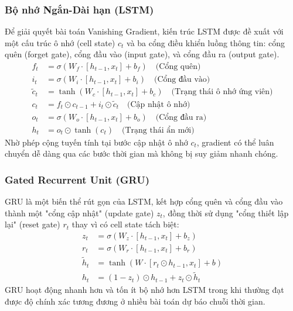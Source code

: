\documentclass[12pt,a4paper]{article}
\begin{document}
\subsubsection{Bộ nhớ Ngắn-Dài hạn (LSTM)}
Để giải quyết bài toán Vanishing Gradient, kiến trúc LSTM được đề xuất với một cấu trúc ô nhớ (cell state) $c_t$ và ba cổng điều khiển luồng thông tin: cổng quên (forget gate), cổng đầu vào (input gate), và cổng đầu ra (output gate).
\begin{align}
    f_t &= \sigma(W_f \cdot [h_{t-1}, x_t] + b_f) \quad \text{(Cổng quên)} \\
    i_t &= \sigma(W_i \cdot [h_{t-1}, x_t] + b_i) \quad \text{(Cổng đầu vào)} \\
    \tilde{c}_t &= \tanh(W_c \cdot [h_{t-1}, x_t] + b_c) \quad \text{(Trạng thái ô nhớ ứng viên)} \\
    c_t &= f_t \odot c_{t-1} + i_t \odot \tilde{c}_t \quad \text{(Cập nhật ô nhớ)} \\
    o_t &= \sigma(W_o \cdot [h_{t-1}, x_t] + b_o) \quad \text{(Cổng đầu ra)} \\
    h_t &= o_t \odot \tanh(c_t) \quad \text{(Trạng thái ẩn mới)}
\end{align}
Nhờ phép cộng tuyến tính tại bước cập nhật ô nhớ $c_t$, gradient có thể luân chuyển dễ dàng qua các bước thời gian mà không bị suy giảm nhanh chóng.

\subsubsection{Gated Recurrent Unit (GRU)}
GRU là một biến thể rút gọn của LSTM, kết hợp cổng quên và cổng đầu vào thành một "cổng cập nhật" (update gate) $z_t$, đồng thời sử dụng "cổng thiết lập lại" (reset gate) $r_t$ thay vì có cell state tách biệt:
\begin{align}
    z_t &= \sigma(W_z \cdot [h_{t-1}, x_t] + b_z) \\
    r_t &= \sigma(W_r \cdot [h_{t-1}, x_t] + b_r) \\
    \tilde{h}_t &= \tanh(W \cdot [r_t \odot h_{t-1}, x_t] + b) \\
    h_t &= (1 - z_t) \odot h_{t-1} + z_t \odot \tilde{h}_t
\end{align}
GRU hoạt động nhanh hơn và tốn ít bộ nhớ hơn LSTM trong khi thường đạt được độ chính xác tương đương ở nhiều bài toán dự báo chuỗi thời gian.

\newpage
\end{document}
